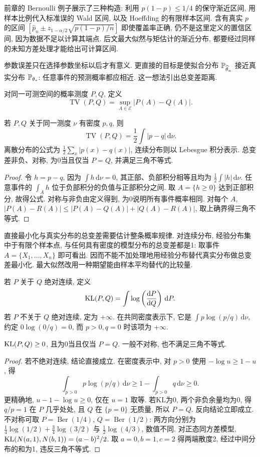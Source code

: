 前章的 Bernoulli 例子展示了三种构造: 利用 $p(1-p)\le1/4$ 的保守渐近区间, 用样本比例代入标准误的 Wald 区间, 以及 Hoeffding 的有限样本区间. 含有真实 $p$ 的区间 $[\widehat p_n\pm z_{1-\alpha/2}\sqrt{p(1-p)/n}]$ 即使覆盖率正确, 仍不是这里定义的置信区间, 因为数据不足以计算其端点. 后文最大似然与矩估计的渐近分布, 都要经过同样的未知方差处理才能给出可计算区间.

参数误差只在选择参数坐标以后才有意义. 更直接的目标是使拟合分布 $\mathbb P_{\widehat\theta_n}$ 接近真实分布 $\mathbb P_{\theta_*}$: 任意事件的预测概率都应相近. 这一想法引出总变差距离.

\begin{definition}[总变差距离]
对同一可测空间的概率测度 $P,Q$, 定义
\[
 \operatorname{TV}(P,Q)=\sup_{A\in\mathcal E}|P(A)-Q(A)|.
\]
\end{definition}
\begin{proposition}
若 $P,Q$ 关于同一测度 $\nu$ 有密度 $p,q$, 则
\[
 \operatorname{TV}(P,Q)=\frac12\int|p-q|\,\mathrm d\nu.
\]
离散分布的公式为 $\frac12\sum_x|p(x)-q(x)|$, 连续分布则以 Lebesgue 积分表示. 总变差非负、对称, 为0当且仅当 $P=Q$, 并满足三角不等式.
\end{proposition}
\begin{proof}
令 $h=p-q$, 因为 $\int h\,\mathrm d\nu=0$, 其正部、负部积分相等且均为 $\frac12\int|h|\,\mathrm d\nu$. 任意事件的 $\int_Ah$ 位于负部积分的负值与正部积分之间. 取 $A=\{h\ge0\}$ 达到正部积分, 故得公式. 对称与非负由定义得到, 为0说明所有事件概率相同. 对每个 $A$, $|P(A)-R(A)|\le|P(A)-Q(A)|+|Q(A)-R(A)|$, 取上确界得三角不等式.
\end{proof}
直接最小化与真实分布的总变差需要估计整条概率规律. 对连续分布, 经验分布集中于有限个样本点, 与任何具有密度的模型分布的总变差都是1: 取事件 $A=\{X_1,\ldots,X_n\}$ 即可看出. 因而不能不加处理地用经验分布替代真实分布做总变差最小化. 最大似然改用一种期望能由样本平均替代的比较量.

\begin{definition}
若 $P$ 关于 $Q$ 绝对连续, 定义
\[
 \operatorname{KL}(P,Q)=\int\log\left(\frac{\mathrm dP}{\mathrm dQ}\right)\,\mathrm dP.
\]
若 $P$ 不关于 $Q$ 绝对连续, 定为 $+\infty$. 在共同密度表示下, 它是 $\int p\log(p/q)\,\mathrm d\nu$, 约定 $0\log(0/q)=0$, 而 $p>0,q=0$ 时该项为 $+\infty$.
\end{definition}
\begin{proposition}[KL的非负性]
$\operatorname{KL}(P,Q)\ge0$, 且为0当且仅当 $P=Q$. 一般不对称, 也不满足三角不等式.
\end{proposition}
\begin{proof}
若不绝对连续, 结论直接成立. 在密度表示中, 对 $p>0$ 使用 $-\log u\ge1-u$, 得
\[
 \int_{p>0}p\log(p/q)\,\mathrm d\nu
 \ge1-\int_{p>0}q\,\mathrm d\nu\ge0.
\]
更精确地, $u-1-\log u\ge0$, 仅在 $u=1$ 取等. 若KL为0, 两个非负余量均为0, 得 $q/p=1$ 在 $P$ 几乎处处, 且 $Q$ 在 $\{p=0\}$ 无质量, 所以 $P=Q$. 反向结论立即成立. 不对称可取 $P=\operatorname{Ber}(1/4)$, $Q=\operatorname{Ber}(1/2)$: 两方向分别为 $\frac14\log(1/2)+\frac34\log(3/2)$ 与 $\frac12\log(4/3)$, 数值不同. 对正态同方差模型, $\operatorname{KL}(N(a,1),N(b,1))=(a-b)^2/2$. 取 $a=0,b=1,c=2$ 得两端散度2, 经过中间分布的和为1, 违反三角不等式.
\end{proof}

